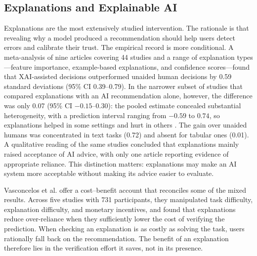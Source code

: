 \documentclass[oneside,final,14pt,a4paper]{extreport}
\begin{document}
\subsection{Explanations and Explainable AI}
\label{sec:lit-xai}

Explanations are the most extensively studied intervention. The rationale is
that revealing why a model produced a recommendation should help users detect
errors and calibrate their trust. The empirical record is more conditional. A
meta-analysis of nine articles covering 44 studies and a range of explanation
types---feature importance, example-based explanations, and confidence
scores---found that XAI-assisted decisions outperformed unaided human decisions
by 0.59 standard deviations (95\% CI 0.39--0.79). In the narrower subset of
studies that compared explanations with an AI recommendation alone, however,
the difference was only 0.07 (95\% CI $-0.15$--$0.30$): the pooled estimate
concealed substantial heterogeneity, with a prediction interval ranging from
$-0.59$ to $0.74$, so explanations helped in some settings and hurt in others
\cite{Schemmer2022}. The gain over unaided humans was concentrated
in text tasks (0.72) and absent for tabular ones (0.01). A qualitative reading
of the same studies concluded that explanations mainly raised acceptance of AI
advice, with only one article reporting evidence of appropriate reliance. This
distinction matters: explanations may make an AI system more acceptable without
making its advice easier to evaluate.

Vasconcelos et al. \cite{Vasconcelos2022} offer a cost--benefit account that
reconciles some of the mixed results. Across five studies with 731
participants, they manipulated task difficulty, explanation difficulty, and
monetary incentives, and found that explanations reduce over-reliance when they
sufficiently lower the cost of verifying the prediction. When checking an
explanation is as costly as solving the task, users rationally fall back on the
recommendation. The benefit of an explanation therefore lies in the verification
effort it saves, not in its presence.
\end{document}
